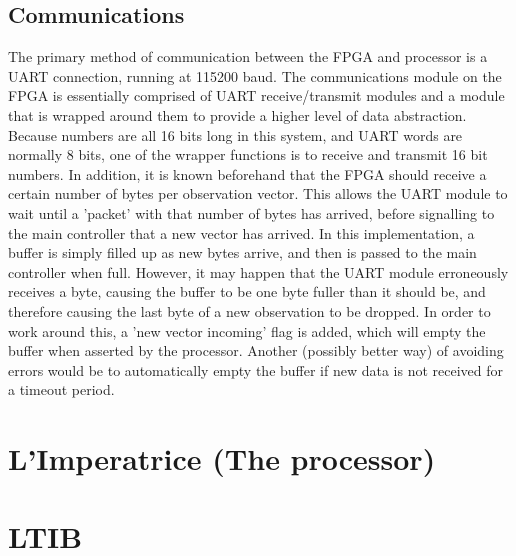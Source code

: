 	\subsection{Communications} %
	\label{sub:communications}
		The primary method of communication between the FPGA and processor is a UART connection, running at 115200 baud.  The communications module on the FPGA is essentially comprised of UART receive/transmit modules and a module that is wrapped around them to provide a higher level of data abstraction.  Because numbers are all 16 bits long in this system, and UART words are normally 8 bits, one of the wrapper functions is to receive and transmit 16 bit numbers.  In addition, it is known beforehand that the FPGA should receive a certain number of bytes per observation vector.  This allows the UART module to wait until a 'packet' with that number of bytes has arrived, before signalling to the main controller that a new vector has arrived.  In this implementation, a buffer is simply filled up as new bytes arrive, and then is passed to the main controller when full.  However, it may happen that the UART module erroneously receives a byte, causing the buffer to be one byte fuller than it should be, and therefore causing the last byte of a new observation to be dropped.  In order to work around this, a 'new vector incoming' flag is added, which will empty the buffer when asserted by the processor.  Another (possibly better way) of avoiding errors would be to automatically empty the buffer if new data is not received for a timeout period.
	



\section{L'Imperatrice (The processor)} %
\label{sec:l_imperatrice_processor}



	\section{LTIB} %
	\label{sec:ltib}





